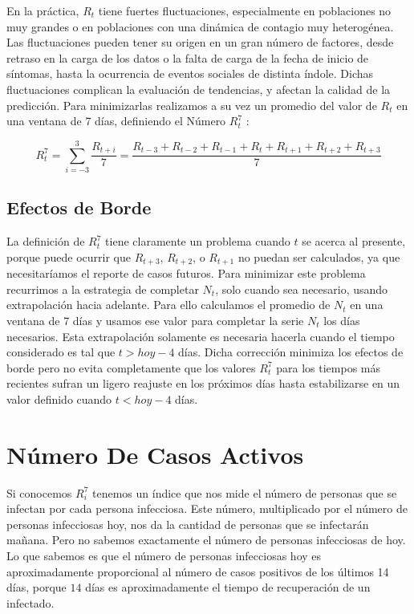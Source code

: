 \documentclass[12pt,a4paper]{article}
\begin{document}
En la práctica, $R_t$ tiene fuertes fluctuaciones, especialmente en poblaciones 
no muy grandes o en poblaciones con una dinámica de contagio muy heterogénea. 
Las fluctuaciones pueden tener su origen en un gran número de factores, 
desde retraso en la carga de los datos o la falta de carga de la 
fecha de inicio de síntomas, hasta la ocurrencia de eventos sociales de distinta índole. 
Dichas fluctuaciones complican la evaluación de tendencias, y afectan la calidad de la 
predicción. Para minimizarlas realizamos a su vez 
un promedio del valor de $R_t$ en una ventana de 7 días, 
definiendo el Número $R^7_t$ :

\begin{equation}
R^7_t = \sum_{i=-3}^{3} \frac{R_{t+i}}{7} = 
\frac{R_{t-3}+R_{t-2}+R_{t-1}+R_t+R_{t+1}+R_{t+2}+R_{t+3}}{7}
\end{equation}

\subsection*{Efectos de Borde}
La definición de $R^7_t$ tiene claramente 
un problema cuando $t$ se acerca al presente, porque 
puede ocurrir que $R_{t+3}$, $R_{t+2}$, o $R_{t+1}$ no puedan 
ser calculados, ya que necesitaríamos el reporte de casos 
futuros. Para minimizar este problema recurrimos a la estrategia 
de completar $N_t$, solo cuando sea necesario, 
usando extrapolación hacia adelante. Para ello 
calculamos el promedio de $N_t$ en una ventana de 7 días 
y usamos ese valor para completar la serie $N_t$ los 
días necesarios. 
Esta extrapolación solamente es necesaria hacerla 
cuando el tiempo considerado es tal que $t>hoy-4$ días. Dicha corrección minimiza los efectos de borde 
pero no evita completamente que los valores 
$R^7_t$ para los tiempos más recientes 
sufran un ligero reajuste en los próximos días 
hasta estabilizarse en un valor definido 
cuando $t<hoy-4$ días.  

\section*{Número De Casos Activos}

Si conocemos $R^7_i$ tenemos un índice que nos mide el número de personas 
que se infectan por cada persona infecciosa. Este número,
multiplicado por el número de personas infecciosas hoy, nos da la 
cantidad de personas que se infectarán mañana.
Pero no sabemos exactamente el número de personas infecciosas de hoy. 
Lo que sabemos es que el número de personas infecciosas hoy es aproximadamente 
proporcional al número de casos positivos de los últimos 14 días, 
porque $14$ días es aproximadamente el tiempo de recuperación de un infectado.
\end{document}
